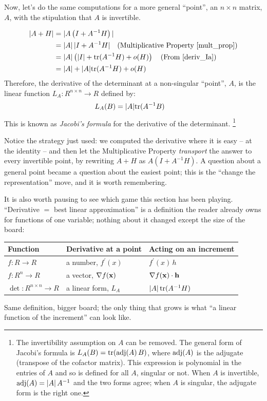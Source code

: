 \documentclass{article}
\begin{document}
Now, let's do the same computations for a more general ``point'',
an $n\times n$ matrix, $A$, with the stipulation that $A$ is invertible.

\begin{align}
  |A + H| &= |A\left(I + A^{-1}H\right)| \nonumber \\
          &= |A|\, |I + A^{-1}H|
                \quad \text{(Multiplicative Property \eqref{mult_prop})} \nonumber \\
          &= |A| \left(|I| + {\rm tr}(A^{-1}H) + o(H)\right)
                \quad \text{(From \eqref{deriv_Ia})} \nonumber \\
  &= |A| + |A|{\rm tr}(A^{-1}H) + o(H)
\end{align}
Therefore, the derivative of the determinant at a non-singular ``point'', $A$,
is the linear function $L_A: R^{n \times n} \rightarrow R$ defined by:
\begin{align}
  L_A(B) &= |A| {\rm tr}(A^{-1}B) \label{det_deriv}
\end{align}
This is known as {\em Jacobi's formula\/} for the derivative of the determinant.%
\footnote{The invertibility assumption on $A$ can be removed. The general form of
Jacobi's formula is $L_A(B) = {\rm tr}\!\left({\rm adj}(A) \, B\right)$,
where ${\rm adj}(A)$ is the adjugate (transpose of the cofactor matrix). This
expression is polynomial in the entries of $A$ and so is defined for all $A$,
singular or not. When $A$ is invertible, ${\rm adj}(A) = |A| \, A^{-1}$ and the
two forms agree; when $A$ is singular, the adjugate form is the right one.}

Notice the strategy just used: we computed the derivative where it is easy --
at the identity -- and then let the Multiplicative Property {\em transport\/}
the answer to every invertible point, by rewriting $A + H$ as
$A\left(I + A^{-1}H\right)$. A question about a general point became a question
about the easiest point; this is the ``change the representation'' move, and it
is worth remembering.

It is also worth pausing to see which game this section has been playing.
``Derivative $=$ best linear approximation'' is a definition the reader already
owns for functions of one variable; nothing about it changed except the size of
the board:
\begin{center}
\begin{tabular}{l|l|l}
{\bf Function} & {\bf Derivative at a point} & {\bf Acting on an increment} \\
\hline
$f: R \rightarrow R$ & a number, $f^\prime(x)$ & $f^\prime(x) \, h$ \\
$f: R^n \rightarrow R$ & a vector, $\nabla f({\bf x})$ & $\nabla f({\bf x}) \cdot {\bf h}$ \\
$\det: R^{n \times n} \rightarrow R$ & a linear form, $L_A$ & $|A| \, {\rm tr}(A^{-1} H)$ \\
\end{tabular}
\end{center}
Same definition, bigger board; the only thing that grows is what ``a linear
function of the increment'' can look like.
\end{document}
